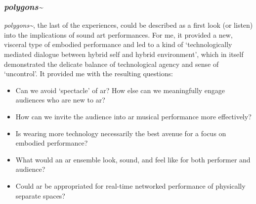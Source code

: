 \subsubsection{\textit{polygons\textasciitilde{}}}
\textit{polygons\textasciitilde{}}, the last of the experiences, could be described as a first look (or listen) into the implications of sound \gls{art} performances. For me, it provided a new, visceral type of embodied performance and led to a kind of `technologically mediated dialogue between hybrid self and hybrid environment', which in itself demonstrated the delicate balance of technological agency and sense of `uncontrol'. It provided me with the resulting questions: 
\begin{itemize}
    \item Can we avoid `spectacle' of \gls{ar}? How else can we meaningfully engage audiences who are new to \gls{ar}?
    \item How can we invite the audience into \gls{ar} musical performance more effectively?
    \item Is wearing more technology necessarily the best avenue for a focus on embodied performance?
    \item What would an \gls{ar} ensemble look, sound, and feel like for both performer and audience?
    \item Could \gls{ar} be appropriated for real-time networked performance of physically separate spaces?
\end{itemize}




